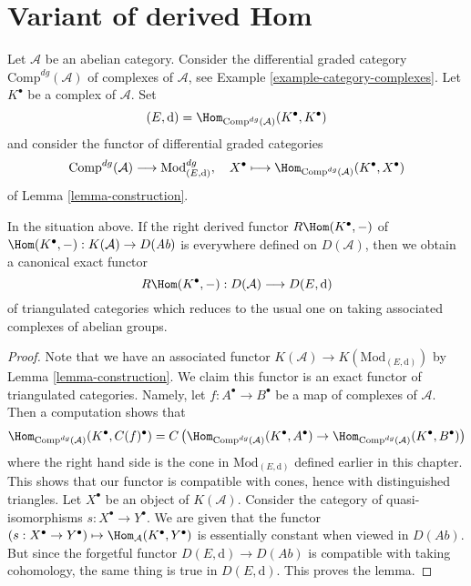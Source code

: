 \section{Variant of derived Hom}
\label{section-variant}

\noindent
Let $\mathcal{A}$ be an abelian category. Consider the differential graded
category $\text{Comp}^{dg}(\mathcal{A})$ of complexes of $\mathcal{A}$, see
Example \ref{example-category-complexes}.
Let $K^\bullet$ be a complex of $\mathcal{A}$. Set
$$
(E, \text{d}) = \Hom_{\text{Comp}^{dg}(\mathcal{A})}(K^\bullet, K^\bullet)
$$
and consider the functor of differential graded categories
$$
\text{Comp}^{dg}(\mathcal{A}) \longrightarrow \text{Mod}^{dg}_{(E, \text{d})},
\quad
X^\bullet
\longmapsto
\Hom_{\text{Comp}^{dg}(\mathcal{A})}(K^\bullet, X^\bullet)
$$
of Lemma \ref{lemma-construction}.

\begin{lemma}
\label{lemma-existence-of-derived}
In the situation above. If the right derived functor $R\Hom(K^\bullet, -)$
of $\Hom(K^\bullet, -) : K(\mathcal{A}) \to D(\textit{Ab})$
is everywhere defined on $D(\mathcal{A})$, then we obtain a canonical exact
functor
$$
R\Hom(K^\bullet, -) : D(\mathcal{A}) \longrightarrow D(E, \text{d})
$$
of triangulated categories which reduces to the usual one  on taking
associated complexes of abelian groups.
\end{lemma}

\begin{proof}
Note that we have an associated functor
$K(\mathcal{A}) \to K(\text{Mod}_{(E, \text{d})})$ by
Lemma \ref{lemma-construction}.
We claim this functor is an exact functor of triangulated categories.
Namely, let $f : A^\bullet \to B^\bullet$ be a map of complexes
of $\mathcal{A}$. Then a computation shows that
$$
\Hom_{\text{Comp}^{dg}(\mathcal{A})}(K^\bullet, C(f)^\bullet)
=
C\left(
\Hom_{\text{Comp}^{dg}(\mathcal{A})}(K^\bullet, A^\bullet) \to
\Hom_{\text{Comp}^{dg}(\mathcal{A})}(K^\bullet, B^\bullet)
\right)
$$
where the right hand side is the cone in $\text{Mod}_{(E, \text{d})}$
defined earlier in this chapter.
This shows that our functor is compatible with cones, hence with
distinguished triangles. Let $X^\bullet$ be an object of $K(\mathcal{A})$.
Consider the category of quasi-isomorphisms $s : X^\bullet \to Y^\bullet$.
We are given that the functor
$(s : X^\bullet \to Y^\bullet) \mapsto \Hom_\mathcal{A}(K^\bullet, Y^\bullet)$
is essentially constant when viewed in $D(\textit{Ab})$.
But since the forgetful functor $D(E, \text{d}) \to D(\textit{Ab})$
is compatible with taking cohomology, the same thing is true in
$D(E, \text{d})$. This proves the lemma.
\end{proof}

